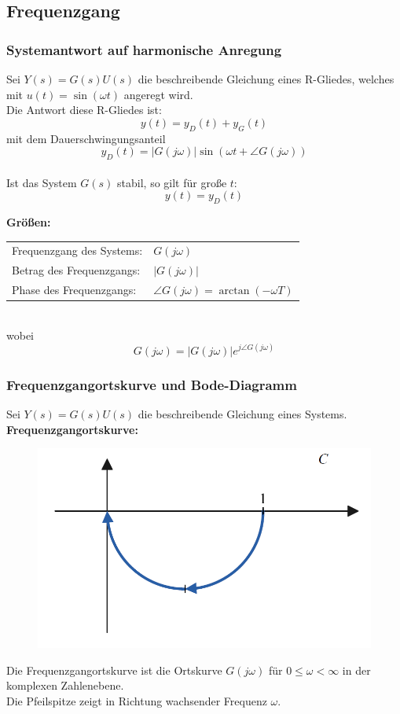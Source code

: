 \documentclass[10pt,a4paper]{article}
\begin{document}
\subsection{Frequenzgang}
\subsubsection{Systemantwort auf harmonische Anregung}
Sei $Y(s) = G(s)U(s)$ die beschreibende Gleichung eines R-Gliedes, welches mit $u(t) = \sin(\omega t)$ angeregt wird. \\
Die Antwort diese R-Gliedes ist:
$$
	y(t) = y_D(t) + y_G(t)
$$
mit dem Dauerschwingungsanteil
$$
	y_D(t) = |G(j\omega)| \sin(\omega t + \angle G(j \omega))
$$ \\

Ist das System $G(s)$ stabil, so gilt für große $t$:
$$
	y(t) = y_D(t)
$$

\textbf{Größen:} \\
\begin{tabular}{ll}
	Frequenzgang des Systems: & $G(j \omega)$ \\
	Betrag des Frequenzgangs: & $|G(j \omega)|$ \\
	Phase des Frequenzgangs: & $\angle G(j \omega) = \arctan(-\omega T)$
\end{tabular} \\

wobei
$$
	G(j \omega) = |G(j \omega)| e^{j \angle G(j \omega)}
$$

\subsubsection{Frequenzgangortskurve und Bode-Diagramm}
Sei $Y(s) = G(s)U(s)$ die beschreibende Gleichung eines Systems. \\

\textbf{Frequenzgangortskurve:} \\
\begin{figure}[H]
	\includegraphics[width=0.3\columnwidth]{imgs/frequenzgangortskurve.png}
\end{figure}
Die Frequenzgangortskurve ist die Ortskurve $G(j \omega)$ für $0 ≤ \omega < ∞$ in der komplexen Zahlenebene. \\
Die Pfeilspitze zeigt in Richtung wachsender Frequenz $\omega$. \\
\end{document}
